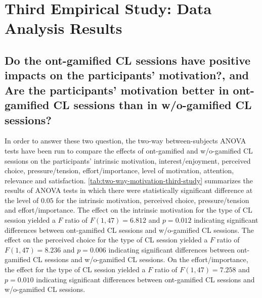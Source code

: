 \section{Third Empirical Study: Data Analysis Results}
\label{sec:third-study}

\subsection*{Do the ont-gamified CL sessions have positive impacts on the participants' motivation?, and
Are the participants' motivation better in ont-gamified CL sessions than in w/o-gamified CL sessions?}

In order to answer these two question, the two-way between-subjects ANOVA tests have been run to compare the effects of ont-gamified and w/o-gamified CL sessions on the participants' intrinsic motivation, interest/enjoyment, perceived choice, pressure/tension, effort/importance, level of motivation, attention, relevance and satisfaction.
\autoref{tab:two-way-motivation-third-study}  summarizes the results of ANOVA tests in which there were statistically significant difference at the level of $0.05$ for the intrinsic motivation, perceived choice, pressure/tension and effort/importance.
The effect on the intrinsic motivation for the type of CL session yielded a $F$ ratio of $F(1,47) = 6.812$ and $p = 0.012$ indicating significant differences between ont-gamified CL sessions and w/o-gamified CL sessions.
The effect on the perceived choice for the type of CL session yielded a $F$ ratio of $F(1,47) = 8.236$ and $p = 0.006$ indicating significant differences between ont-gamified CL sessions and w/o-gamified CL sessions. On the effort/importance, the effect for the type of CL session yielded a $F$ ratio of $F(1,47) = 7.258$ and $p = 0.010$ indicating significant differences between ont-gamified CL sessions and w/o-gamified CL sessions. 

